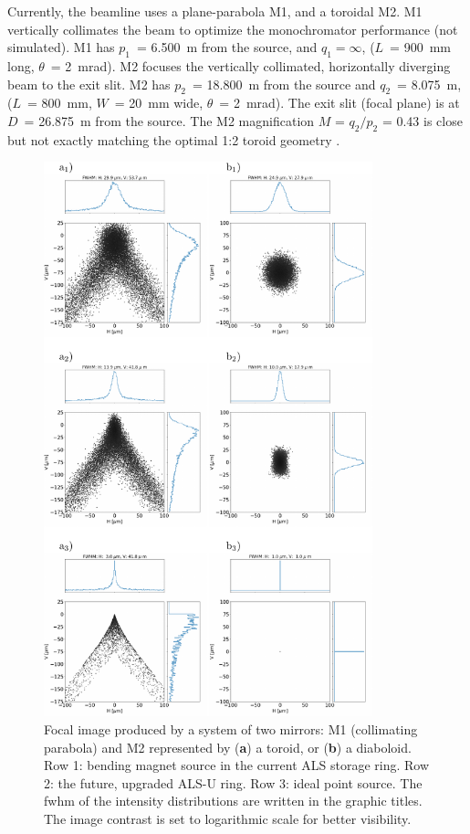 \documentclass[preprint]{iucr}       %
\newcommand{\inblue}[1]{{\color{blue}#1}}
\begin{document}
Currently, the beamline uses a plane-parabola M1, and a toroidal M2. M1 vertically collimates the beam to optimize the monochromator performance (not simulated). M1 has $p_1$~= \SI{6.500}{\meter} from the source, and $q_1=\infty$, ($L$~= \SI{900}{\milli\meter} long, $\theta$~= \SI{2}{\milli\radian}). M2 focuses the vertically collimated, horizontally diverging beam to the exit slit. M2 has $p_2$~= \SI{18.800}{\meter} from the source and $q_2$~= \SI{8.075}{\meter}, (\inblue{$L$~= \SI{800}{\milli\meter}}, $W$~= \SI{20}{\milli\meter} wide, $\theta$~= \SI{2}{\milli\radian}). The exit slit (focal plane) is at $D$~= \SI{26.875}{\meter} from the source. The M2 magnification $M$ = $q_2/p_2$ = 0.43 is close but not exactly matching the optimal 1:2 toroid geometry \cite{MacDowell2004}.


\begin{figure}\label{fig:als}
\includegraphics[width=0.85\textwidth]{figures/fig4.pdf}
\caption{Focal image produced by a system of two mirrors: M1 (collimating parabola) and M2 represented by (\textbf{a}) a toroid, or (\textbf{b}) a diaboloid. Row 1: bending magnet source in the current ALS storage ring. Row 2: the future, upgraded ALS-U ring. Row 3: ideal point source. The fwhm of the intensity distributions are written in the graphic titles. The image contrast is set to logarithmic scale for better visibility.}
\end{figure}
\end{document}
